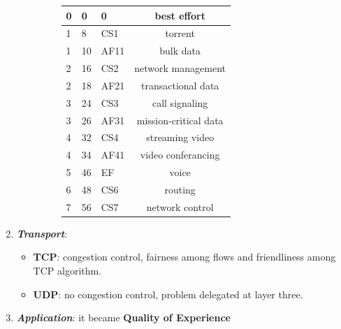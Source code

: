 \begin{enumerate}[nosep]
\begin{itemize}[nosep]
\begin{figure}[h]
\begin{tabular}{ | p{1cm} | p{2cm} | p{2cm} | c | }
                0 & 0 & 0 & best effort \\ \hline
                1 & 8 & CS1 & torrent \\ \hline
                1 & 10 & AF11 & bulk data \\ \hline
                2 & 16 & CS2 & network management \\ \hline
                2 & 18 & AF21 & transactional data \\ \hline
                3 & 24 & CS3 & call signaling \\ \hline
                3 & 26 & AF31 & mission-critical data \\ \hline
                4 & 32 & CS4 & streaming video \\ \hline
                4 & 34 & AF41 & video conferancing \\ \hline
                5 & 46 & EF & voice \\ \hline
                6 & 48 & CS6 & routing \\ \hline
                7 & 56 & CS7 & network control \\ \hline
            \end{tabular}
        \end{figure}
    \end{itemize}

    \item \textbf{\textit{Transport}}:
    \begin{itemize}[nosep]
        \item \textbf{TCP}: congestion control, fairness among flows and friendliness among TCP algorithm.
        \item \textbf{UDP}: no congestion control, problem delegated at layer three.
    \end{itemize}

    \item \textbf{\textit{Application}}: it became \textbf{Quality of Experience}

\end{enumerate}